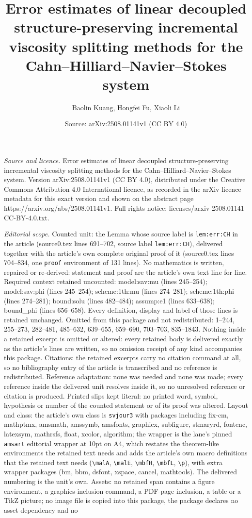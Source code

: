 \documentclass[10pt,a4paper]{amsart}
\title[Error estimates of linear decoupled structure-preserving inc]{Error estimates of linear decoupled structure-preserving incremental viscosity splitting methods for the Cahn--Hilliard--Navier--Stokes system}
\author{Baolin Kuang, Hongfei Fu, Xiaoli Li}
\date{Source: arXiv:2508.01141v1 (CC BY 4.0)}
\begin{document}
\maketitle

\noindent\emph{Source and licence.} Error estimates of linear decoupled structure-preserving incremental viscosity splitting methods for the Cahn--Hilliard--Navier--Stokes system. Version arXiv:2508.01141v1 (CC BY 4.0), distributed under the Creative Commons Attribution 4.0 International licence, as recorded in the arXiv licence metadata for this exact version and shown on the abstract page https://arxiv.org/abs/2508.01141v1. Full rights notice: licenses/arxiv-2508.01141-CC-BY-4.0.txt.\par\smallskip

\noindent\textit{Editorial scope.} Counted unit: the Lemma whose source label is \texttt{lem:err:CH} in the article (source0.tex lines 691--702, source label \texttt{lem:err:CH}), delivered together with the article's own complete original proof of it (source0.tex lines 704--834, one \texttt{proof} environment of 131 lines). No mathematics is written, repaired or re-derived: statement and proof are the article's own text line for line. Required context retained uncounted: model:sav:mu (lines 245--254); model:sav:phi (lines 245--254); scheme:1th:mu (lines 274--281); scheme:1th:phi (lines 274--281); bound:solu (lines 482--484); assump:e1 (lines 633--638); bound\_phi (lines 656--658). Every definition, display and label of those lines is retained unchanged. Omitted from this package and not redistributed: 1--244, 255--273, 282--481, 485--632, 639--655, 659--690, 703--703, 835--1843. Nothing inside a retained excerpt is omitted or altered: every retained body is delivered exactly as the article's lines are written, so no omission receipt of any kind accompanies this package. Citations: the retained excerpts carry no citation command at all, so no bibliography entry of the article is transcribed and no reference is redistributed. Reference adaptation: none was needed and none was made; every reference inside the delivered unit resolves inside it, so no unresolved reference or citation is produced. Printed slips kept literal: no printed word, symbol, hypothesis or number of the counted statement or of its proof was altered. Layout and class: the article's own class is \texttt{svjour3} with packages including fix-cm, mathptmx, amsmath, amssymb, amsfonts, graphicx, subfigure, stmaryrd, fontenc, latexsym, mathrsfs, float, xcolor, algorithm; the wrapper is the lane's pinned \texttt{amsart} editorial wrapper at 10pt on A4, which restates the theorem-like environments the retained text needs and adds the article's own macro definitions that the retained text needs (\texttt{\textbackslash malA}, \texttt{\textbackslash malE}, \texttt{\textbackslash mbfH}, \texttt{\textbackslash mbfL}, \texttt{\textbackslash p}), with extra wrapper packages (bm, bbm, dsfont, xspace, cancel, mathtools). The delivered numbering is the unit's own. Assets: no retained span contains a figure environment, a graphics-inclusion command, a PDF-page inclusion, a table or a TikZ picture; no image file is copied into this package, the package declares no asset dependency and no 
\end{document}
